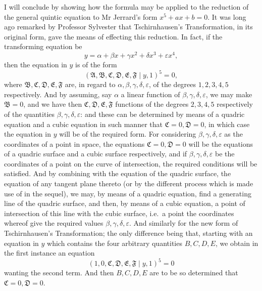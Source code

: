 \documentclass[11pt]{article}
\begin{document}
I will conclude by showing how the formula may be applied to the reduction of
the general quintic equation to Mr Jerrard's form $x^{5}+ax+b=0$. It was long ago
remarked by Professor Sylvester that Tschirnhausen's Transformation, in its original
form, gave the means of effecting this reduction. In fact, if the transforming equation be
\[ y=\alpha+\beta x+\gamma x^{2}+\delta x^{3}+\varepsilon x^{4}, \]
then the equation in $y$ is of the form
\[ (\mathfrak{A},\mathfrak{B},\mathfrak{C},\mathfrak{D},\mathfrak{E},\mathfrak{F} \mid y,1)^{5}=0, \]
where $\mathfrak{B},\mathfrak{C},\mathfrak{D},\mathfrak{E},\mathfrak{F}$ are, in regard to
$\alpha,\beta,\gamma,\delta,\varepsilon$, of the degrees $1,2,3,4,5$ respectively. And by assuming,
say $\alpha$ a linear function of $\beta,\gamma,\delta,\varepsilon$, we may make
$\mathfrak{B}=0$, and we have then $\mathfrak{C},\mathfrak{D},\mathfrak{E},\mathfrak{F}$ functions
of the degrees $2,3,4,5$ respectively of the quantities $\beta,\gamma,\delta,\varepsilon$:
and these can be determined by means of a quadric equation and a cubic equation
in such manner that $\mathfrak{C}=0,\mathfrak{D}=0$, in which case the equation in $y$ will
be of the required form. For considering $\beta,\gamma,\delta,\varepsilon$ as the coordinates
of a point in space, the equations $\mathfrak{C}=0,\mathfrak{D}=0$ will be the equations of
a quadric surface and a cubic surface respectively, and if $\beta,\gamma,\delta,\varepsilon$
be the coordinates of a point on the curve of intersection, the required conditions will
be satisfied. And by combining with the equation of the quadric surface, the equation
of any tangent plane thereto (or by the different process which is made use of in the
sequel), we may, by means of a quadric equation, find a generating line of the quadric
surface, and then, by means of a cubic equation, a point of intersection of this line
with the cubic surface, i.e.\ a point the coordinates whereof give the required values
$\beta,\gamma,\delta,\varepsilon$. And similarly for the new form of Tschirnhausen's Transformation;
the only difference being that, starting with an equation in $y$ which contains the four
arbitrary quantities $B,C,D,E$, we obtain in the first instance an equation
\[ (1,0,\mathfrak{C},\mathfrak{D},\mathfrak{E},\mathfrak{F} \mid y,1)^{5}=0 \]
wanting the second term. And then $B,C,D,E$ are to be so determined that
$\mathfrak{C}=0,\mathfrak{D}=0$.
\end{document}
